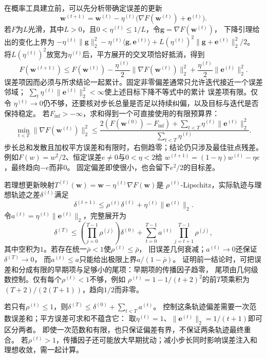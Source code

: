 在概率工具建立前，可以先分析带确定误差的更新
\[
  \bm{w}^{(t+1)}
  =\bm{w}^{(t)}-\eta^{(t)}
  \bigl(\nabla F(\bm{w}^{(t)})+\bm{e}^{(t)}\bigr).
\]
若$F$为$L$光滑，其中$L>0$，且$0<\eta^{(t)}\leq1/L$，令$\bm g=\nabla F(\bm w^{(t)})$，
下降引理给出的变化上界为
$-\eta^{(t)}\|\bm g\|_2^2-\eta^{(t)}\langle\bm g,\bm e^{(t)}\rangle
+L(\eta^{(t)})^2\|\bm g+\bm e^{(t)}\|_2^2/2$。
将$L(\eta^{(t)})^2$放宽为$\eta^{(t)}$后，平方展开的交叉项恰好抵消，得到
\[
  F(\bm{w}^{(t+1)})
  \leq F(\bm{w}^{(t)})
  -\frac{\eta^{(t)}}{2}\lVert\nabla F(\bm{w}^{(t)})\rVert_2^2
  +\frac{\eta^{(t)}}{2}\lVert\bm{e}^{(t)}\rVert_2^2.
\]
误差项因而必须与所求结论一起累计。固定非零偏差通常只允许迭代接近一个误差邻域；
$\sum_t\eta^{(t)}\lVert\bm{e}^{(t)}\rVert_2^2<\infty$使上述目标下降不等式中的累计
误差项有限。仅令
$\eta^{(t)}\to0$仍不够，还要核对步长总量是否足以持续纠偏，以及目标与迭代是否保持稳定。
若$F_{\inf}>-\infty$，求和得到一个可直接使用的有限预算界：
\begin{equation}
 \min_{t<T}\|\nabla F(\bm w^{(t)})\|_2^2
 \leq\frac{2(F(\bm w^{(0)})-F_{\inf})
             +\sum_{t<T}\eta^{(t)}\|\bm e^{(t)}\|_2^2}
            {\sum_{t<T}\eta^{(t)}}.
 \label{eq:opt-inexact-gradient-finite-rate}
\end{equation}
步长总和发散且加权平方误差和有限时，右侧趋零；结论仍只涉及最佳驻点残差。
例如$F(w)=w^2/2$、恒定误差$e\neq0$与$0<\eta<2$给
$w^{(t+1)}=(1-\eta)w^{(t)}-\eta e$，最终趋向$-e$而非$0$。
固定偏差即使很小，也会留下$e^2/2$的目标差。

若理想更新映射$T^{(t)}(\bm{w})=\bm{w}-\eta^{(t)}\nabla F(\bm{w})$是
$\rho^{(t)}$-Lipschitz，实际轨迹与理想轨迹之差$\delta^{(t)}$满足
\begin{equation}
  \delta^{(t+1)}\leq\rho^{(t)}\delta^{(t)}+\eta^{(t)}\lVert\bm{e}^{(t)}\rVert_2.
  \label{eq:opt-inexact-gradient-recurrence}
\end{equation}
令$a^{(t)}=\eta^{(t)}\|\bm e^{(t)}\|_2$，完整展开为
\[
 \delta^{(T)}\leq\left(\prod_{j=0}^{T-1}\rho^{(j)}\right)\delta^{(0)}
 +\sum_{t=0}^{T-1}a^{(t)}\prod_{j=t+1}^{T-1}\rho^{(j)},
\]
其中空积为$1$。若存在统一$\bar\rho<1$使$\rho^{(t)}\leq\bar\rho$，
旧误差几何衰减；$a^{(t)}\to0$还保证$\delta^{(T)}\to0$，
而$a^{(t)}\leq a$只能给出极限上界$a/(1-\bar\rho)$。
证明前一结论时，可把误差和分成有限的早期项与足够小的尾项：早期项的传播因子趋零，
尾项由几何级数控制。仅有每个$\rho^{(t)}<1$不够，例如
$\rho^{(t)}=1-1/(t+2)^2$的前$T$项乘积为$(T+2)/(2(T+1))$，趋向$1/2$而非零。

若只有$\rho^{(t)}\leq1$，则$\delta^{(T)}\leq\delta^{(0)}+\sum_{t<T}a^{(t)}$。
控制这条轨迹偏差需要一次范数误差和；平方误差可求和不蕴含它：
取$\eta^{(t)}=1$、$\|\bm e^{(t)}\|_2=1/(t+1)$即可区分两者。
即使一次范数和有限，也只保证偏差有界，不保证两条轨迹最终重合。
若$\rho^{(t)}>1$，传播因子还可能放大早期扰动；减小步长同时影响误差注入和理想收敛，需一起计算。

